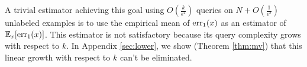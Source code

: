 A trivial estimator achieving this goal using $O(\frac{k}{\epsilon^2})$ queries on $N+O(\frac{1}{\epsilon^2})$ unlabeled examples is to use the empirical mean of ${\mathrm{err}_1}(x)$ as an estimator of $\mathbb E_{x}[{\mathrm{err}_1}(x)]$. %
This estimator is not satisfactory because its query complexity grows with respect to $k$. In Appendix \ref{sec:lower}, we show (Theorem \ref{thm:mv}) that this linear growth with respect to $k$ can't be eliminated. 



